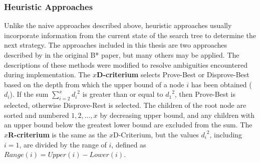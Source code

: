 \subsubsection{Heuristic Approaches}
\label{subsec:strategySelection:Heuristic}
Unlike the naive approaches described above, heuristic approaches usually incorporate information from the current state of the search tree to determine the next strategy. The approaches included in this thesis are two approaches described by  in the original B* paper, but many others may be applied. The descriptions of these methods were modified to resolve ambiguities encountered during implementation. The $x$\textbf{D-criterium} selects Prove-Best or Disprove-Best based on the depth from which the upper bound of a node $i$ has been obtained ($d_i$). If the sum $\sum_{i=2}^x {d_i}^2$ is greater than or equal to ${d_1}^2$, then Prove-Best is selected, otherwise Disprove-Rest is selected. The children of the root node are sorted and numbered $1,2,\dots,x$ by decreasing upper bound, and any children with an upper bound below the greatest lower bound are excluded from the sum. The $x$\textbf{R-criterium} is the same as the $x$D-Criterium, but the values ${d_i}^2$, including $i=1$, are divided by the range of $i$, defined as $Range(i)=Upper(i)-Lower(i)$.
%

